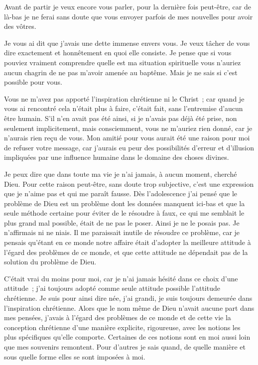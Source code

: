 \documentclass[french,twoside]{book} %
\newcommand\chaptercont{} %
\begin{document}
\chaptercont
\noindent Avant de partir je veux encore vous parler, pour la dernière fois peut-être, car de là-bas je ne ferai sans doute que vous envoyer parfois de mes nouvelles pour avoir des vôtres.\par
Je vous ai dit que j'avais une dette immense envers vous. Je veux tâcher de vous dire exactement et honnêtement en quoi elle consiste. Je pense que si vous pouviez vraiment comprendre quelle est ma situation spirituelle vous n'auriez aucun chagrin de ne pas m'avoir amenée au baptême. Mais je ne sais si c'est possible pour vous.\par
Vous ne m'avez pas apporté l'inspiration chrétienne ni le Christ ; car quand je vous ai rencontré cela n'était plus à faire, c'était fait, sans l'entremise d'aucun être humain. S'il n'en avait pas été ainsi, si je n'avais pas déjà été prise, non seulement implicitement, mais consciemment, vous ne m'auriez rien donné, car je n'aurais rien reçu de vous. Mon amitié pour vous aurait été une raison pour moi de refuser votre message, car j'aurais eu peur des possibilités d'erreur et d'illusion impliquées par une influence humaine dans le domaine des choses divines.\par
Je peux dire que dans toute ma vie je n'ai jamais, à aucun moment, cherché Dieu. Pour cette raison peut-être, sans doute trop subjective, c'est une expression que je n'aime pas et qui me paraît fausse. Dès l'adolescence j'ai pensé que le problème de Dieu est un problème dont les données manquent ici-bas et que la seule méthode certaine pour éviter de le résoudre à faux, ce qui me semblait le plus grand mal possible, était de ne pas le poser. Ainsi je ne le posais pas. Je n'affirmais ni ne niais. Il me paraissait inutile de résoudre ce problème, car je pensais qu'étant en ce monde notre affaire était d'adopter la meilleure attitude à l'égard des problèmes de ce monde, et que cette attitude ne dépendait pas de la solution du problème de Dieu.\par
C'était vrai du moins pour moi, car je n'ai jamais hésité dans ce choix d'une attitude ; j'ai toujours adopté comme seule attitude possible l'attitude chrétienne. Je suis pour ainsi dire née, j'ai grandi, je suis toujours demeurée dans l'inspiration chrétienne. Alors que le nom même de Dieu n'avait aucune part dans mes pensées, j'avais à l'égard des problèmes de ce monde et de cette vie la conception chrétienne d'une manière explicite, rigoureuse, avec les notions les plus spécifiques qu'elle comporte. Certaines de ces notions sont en moi aussi loin que mes souvenirs remontent. Pour d'autres je sais quand, de quelle manière et sous quelle forme elles se sont imposées à moi.\par
\end{document}
